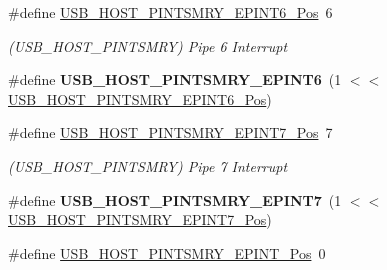 \begin{DoxyCompactItemize}
\item 
\hypertarget{group___s_a_m_l21___u_s_b_ga599d4683711515396759139cde13c6e5}{}\#define \hyperlink{group___s_a_m_l21___u_s_b_ga599d4683711515396759139cde13c6e5}{U\+S\+B\+\_\+\+H\+O\+S\+T\+\_\+\+P\+I\+N\+T\+S\+M\+R\+Y\+\_\+\+E\+P\+I\+N\+T6\+\_\+\+Pos}~6\label{group___s_a_m_l21___u_s_b_ga599d4683711515396759139cde13c6e5}

\begin{DoxyCompactList}\small\item\em (U\+S\+B\+\_\+\+H\+O\+S\+T\+\_\+\+P\+I\+N\+T\+S\+M\+R\+Y) Pipe 6 Interrupt \end{DoxyCompactList}\item 
\hypertarget{group___s_a_m_l21___u_s_b_ga898009c02eaf014ea4405450e61a1701}{}\#define {\bfseries U\+S\+B\+\_\+\+H\+O\+S\+T\+\_\+\+P\+I\+N\+T\+S\+M\+R\+Y\+\_\+\+E\+P\+I\+N\+T6}~(1 $<$$<$ \hyperlink{group___s_a_m_l21___u_s_b_ga599d4683711515396759139cde13c6e5}{U\+S\+B\+\_\+\+H\+O\+S\+T\+\_\+\+P\+I\+N\+T\+S\+M\+R\+Y\+\_\+\+E\+P\+I\+N\+T6\+\_\+\+Pos})\label{group___s_a_m_l21___u_s_b_ga898009c02eaf014ea4405450e61a1701}

\item 
\hypertarget{group___s_a_m_l21___u_s_b_ga8f5e1ba40fbc980904639a70389932b0}{}\#define \hyperlink{group___s_a_m_l21___u_s_b_ga8f5e1ba40fbc980904639a70389932b0}{U\+S\+B\+\_\+\+H\+O\+S\+T\+\_\+\+P\+I\+N\+T\+S\+M\+R\+Y\+\_\+\+E\+P\+I\+N\+T7\+\_\+\+Pos}~7\label{group___s_a_m_l21___u_s_b_ga8f5e1ba40fbc980904639a70389932b0}

\begin{DoxyCompactList}\small\item\em (U\+S\+B\+\_\+\+H\+O\+S\+T\+\_\+\+P\+I\+N\+T\+S\+M\+R\+Y) Pipe 7 Interrupt \end{DoxyCompactList}\item 
\hypertarget{group___s_a_m_l21___u_s_b_gaedcd446eab4502b8f701aa8288c7bac7}{}\#define {\bfseries U\+S\+B\+\_\+\+H\+O\+S\+T\+\_\+\+P\+I\+N\+T\+S\+M\+R\+Y\+\_\+\+E\+P\+I\+N\+T7}~(1 $<$$<$ \hyperlink{group___s_a_m_l21___u_s_b_ga8f5e1ba40fbc980904639a70389932b0}{U\+S\+B\+\_\+\+H\+O\+S\+T\+\_\+\+P\+I\+N\+T\+S\+M\+R\+Y\+\_\+\+E\+P\+I\+N\+T7\+\_\+\+Pos})\label{group___s_a_m_l21___u_s_b_gaedcd446eab4502b8f701aa8288c7bac7}

\item 
\hypertarget{group___s_a_m_l21___u_s_b_ga8190d68c8a2825f05d0c3fcfe946fc2b}{}\#define \hyperlink{group___s_a_m_l21___u_s_b_ga8190d68c8a2825f05d0c3fcfe946fc2b}{U\+S\+B\+\_\+\+H\+O\+S\+T\+\_\+\+P\+I\+N\+T\+S\+M\+R\+Y\+\_\+\+E\+P\+I\+N\+T\+\_\+\+Pos}~0\label{group___s_a_m_l21___u_s_b_ga8190d68c8a2825f05d0c3fcfe946fc2b}


\end{DoxyCompactItemize}
